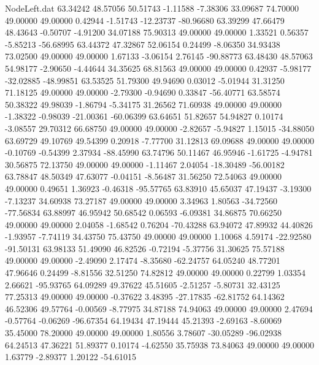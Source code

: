 \begin{filecontents}{NodeLeft.dat}
  63.34242   48.57056   50.51743    -1.11588   -7.38306   33.09687   74.70000   49.00000   49.00000    0.42944   -1.51743  -12.23737  -80.96680
  63.39299   47.66479   48.43643    -0.50707   -4.91200   34.07188   75.90313   49.00000   49.00000    1.33521    0.56357   -5.85213  -56.68995
  63.44372   47.32867   52.06154     0.24499   -8.06350   34.93438   73.02500   49.00000   49.00000    1.67133   -3.06154    2.76145  -90.88773
  63.48430   48.57063   54.98177    -2.90650   -4.44644   34.35625   68.81563   49.00000   49.00000    0.42937   -5.98177  -32.02885  -48.99851
  63.53525   51.79300   49.94690     0.03012   -5.01944   31.31250   71.18125   49.00000   49.00000   -2.79300   -0.94690    0.33847  -56.40771
  63.58574   50.38322   49.98039    -1.86794   -5.34175   31.26562   71.60938   49.00000   49.00000   -1.38322   -0.98039  -21.00361  -60.06399
  63.64651   51.82657   54.94827     0.10174   -3.08557   29.70312   66.68750   49.00000   49.00000   -2.82657   -5.94827    1.15015  -34.88050
  63.69729   49.10769   49.54399     0.20918   -7.77700   31.12813   69.09688   49.00000   49.00000   -0.10769   -0.54399    2.37934  -88.45990
  63.74796   50.11467   46.95946    -1.61725   -4.94781   30.56875   72.13750   49.00000   49.00000   -1.11467    2.04054  -18.30489  -56.00182
  63.78847   48.50349   47.63077    -0.04151   -8.56487   31.56250   72.54063   49.00000   49.00000    0.49651    1.36923   -0.46318  -95.57765
  63.83910   45.65037   47.19437    -3.19300   -7.13237   34.60938   73.27187   49.00000   49.00000    3.34963    1.80563  -34.72560  -77.56834
  63.88997   46.95942   50.68542     0.06593   -6.09381   34.86875   70.66250   49.00000   49.00000    2.04058   -1.68542    0.76204  -70.43288
  63.94072   47.89932   44.40826    -1.93957   -7.74119   34.43750   75.43750   49.00000   49.00000    1.10068    4.59174  -22.92580  -91.50131
  63.98133   51.49090   46.82526    -0.72194   -5.37756   31.30625   75.57188   49.00000   49.00000   -2.49090    2.17474   -8.35680  -62.24757
  64.05240   48.77201   47.96646     0.24499   -8.81556   32.51250   74.82812   49.00000   49.00000    0.22799    1.03354    2.66621  -95.93765
  64.09289   49.37622   45.51605    -2.51257   -5.80731   32.43125   77.25313   49.00000   49.00000   -0.37622    3.48395  -27.17835  -62.81752
  64.14362   46.52306   49.57764    -0.00569   -8.77975   34.87188   74.94063   49.00000   49.00000    2.47694   -0.57764   -0.06269  -96.67354
  64.19434   47.19444   45.21393    -2.69163   -8.60069   35.45000   78.20000   49.00000   49.00000    1.80556    3.78607  -30.05289  -96.02938
  64.24513   47.36221   51.89377     0.10174   -4.62550   35.75938   73.84063   49.00000   49.00000    1.63779   -2.89377    1.20122  -54.61015

\end{filecontents}
